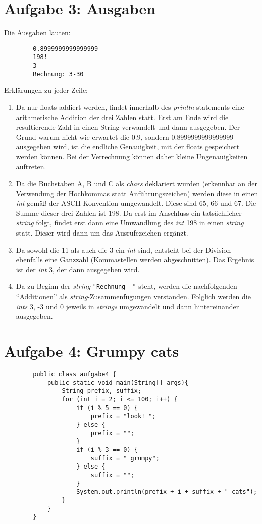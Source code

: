 \documentclass{article}
\begin{document}
    \section*{Aufgabe 3: Ausgaben}
    Die Ausgaben lauten:
    \begin{lstlisting}
        0.8999999999999999
        198!
        3
        Rechnung: 3-30
    \end{lstlisting}
    Erklärungen zu jeder Zeile: 
    \begin{enumerate}
        \item Da nur floats addiert werden, findet innerhalb des \textit{println} statements eine arithmetische Addition der drei Zahlen statt. Erst am Ende wird die resultierende Zahl in einen String verwandelt und dann ausgegeben. Der Grund warum nicht wie erwartet die $0.9$, sondern $0.8999999999999999$ ausgegeben wird, ist die endliche Genauigkeit, mit der floats gespeichert werden können. Bei der Verrechnung können daher kleine Ungenauigkeiten auftreten.
        \item Da die Buchstaben A, B und C als \textit{chars} deklariert wurden (erkennbar an der Verwendung der Hochkommas statt Anführungszeichen) werden diese in einen \textit{int} gemäß der ASCII-Konvention umgewandelt. Diese sind 65, 66 und 67. Die Summe dieser drei Zahlen ist 198. Da erst im Anschluss ein tatsächlicher \textit{string} folgt, findet erst dann eine Umwandlung des \textit{int} 198 in einen \textit{string} statt. Dieser wird dann um das Ausrufezeichen ergänzt.
        \item Da sowohl die 11 als auch die 3 ein \textit{int} sind, entsteht bei der Division ebenfalls eine Ganzzahl (Kommastellen werden abgeschnitten). Das Ergebnis ist der \textit{int} 3, der dann ausgegeben wird. 
        \item Da zu Beginn der \textit{string} \lstinline{"Rechnung  "} steht, werden die nachfolgenden "`Additionen"' als \textit{string}-Zusammenfügungen verstanden. Folglich werden die \textit{ints} 3, -3 und 0 jeweils in \textit{strings} umgewandelt und dann hintereinander ausgegeben. 
    \end{enumerate}

    
    \section*{Aufgabe 4: Grumpy cats}
    \begin{lstlisting}
        public class aufgabe4 {
            public static void main(String[] args){
                String prefix, suffix;
                for (int i = 2; i <= 100; i++) {
                    if (i % 5 == 0) {
                        prefix = "look! ";
                    } else {
                        prefix = "";
                    }
                    if (i % 3 == 0) {
                        suffix = " grumpy";
                    } else {
                        suffix = "";
                    }
                    System.out.println(prefix + i + suffix + " cats");
                }
            }
        }
    \end{lstlisting}
\end{document}
